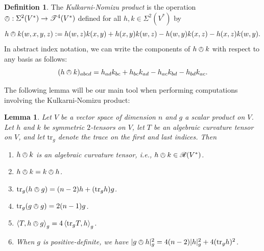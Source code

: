 \documentclass{amsart}
\numberwithin{equation}{section}
\def\~#1{\mathscr{#1}}
\newcommand{\tr}{\mathrm{tr}}
\newcommand{\law}{\left\langle}
\newcommand{\raw}{\right\rangle}
\theoremstyle{plain}
\newtheorem{lem}[thm]{Lemma}
\theoremstyle{definition}
\newtheorem{defn}[thm]{Definition}
\theoremstyle{remark}
\begin{document}
\begin{defn}
    The \emph{Kulkarni-Nomizu product} is the operation $\owedge: \Sigma^2(V^*) \to \~T^4(V^*)$ defined for all $h,k \in \Sigma^2(V^*)$ by 
    \[h \owedge k(w,x,y,z) :=  h(w,z)k(x,y) + h(x,y)k(w,z) - h(w,y)k(x,z) - h(x,z)k(w,y).\]
    In abstract index notation, we can write the components of $h \owedge k$ with respect to any basis as follows:
    \[(h \owedge k)_{abcd} = h_{ad}k_{bc} + h_{bc}k_{ad} - h_{ac}k_{bd} - h_{bd}k_{ac}.\]
\end{defn}
The following lemma will be our main tool when performing computations involving the Kulkarni-Nomizu product:
\begin{lem}\label{KNproperties}
    Let $V$ be a vector space of dimension $n$ and $g$ a scalar product on $V$. Let $h$ and $k$ be symmetric $2$-tensors on $V$, let $T$ be an algebraic curvature tensor on $V$, and let $\tr_g$ denote the trace on the first and last indices. Then
    \begin{enumerate}
        \item \label{KN1} $h \owedge k$ is an algebraic curvature tensor, i.e., $h \owedge k \in \~R(V^*)$. 
        \item \label{KN2} $h \owedge k = k \owedge h$.
        \item \label{KN3} $\tr_g(h \owedge g) = (n-2)h + (\tr_g h)g$.
        \item \label{KN4} $\tr_g(g \owedge g) = 2(n-1)g$.
        \item \label{KN5} $\law T, h \owedge g \raw_g = 4\law \tr_g T, h\raw_g$.
        \item  \label{KN6}When $g$ is positive-definite, we have $|g \owedge h|_g^2 = 4(n-2)|h|_g^2 + 4(\tr_g h)^2$.
    \end{enumerate}
\end{lem}
\end{document}
